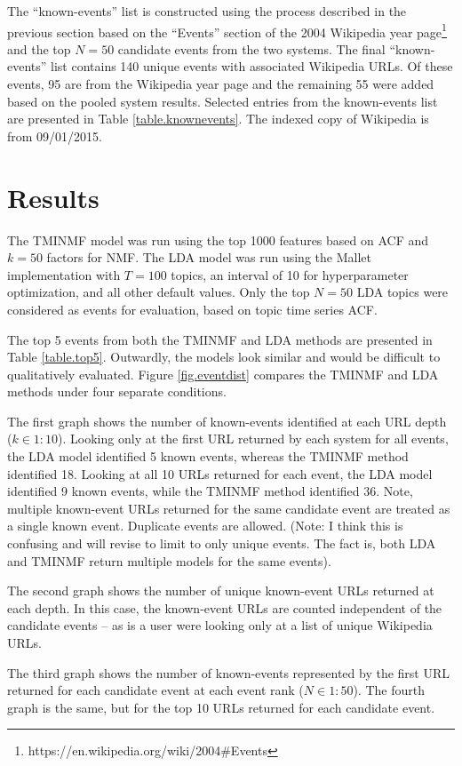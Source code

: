 \documentclass{sig-alternate}
\begin{document}
The ``known-events'' list is constructed using the process described in the previous section based on the ``Events'' section of the 2004 Wikipedia year page\footnote{https://en.wikipedia.org/wiki/2004\#Events} and the top $N=50$ candidate events from the two systems.  The final ``known-events'' list contains 140 unique events with associated Wikipedia URLs. Of these events, 95 are from the Wikipedia year page and the remaining 55 were added based on the pooled system results.  Selected entries from the known-events list are presented in Table \ref{table.knownevents}.  The indexed copy of Wikipedia is from 09/01/2015.

\section{Results}
The TMINMF model was run using the top 1000 features based on ACF and $k=50$ factors for NMF. The LDA model was run using the Mallet implementation with $T=100$ topics, an interval of 10 for hyperparameter optimization, and all other default values. Only the top $N=50$ LDA topics were considered as events for evaluation, based on topic time series ACF.

The top 5 events from both the TMINMF and LDA methods are presented in Table \ref{table.top5}. Outwardly, the models look similar and would be difficult to qualitatively evaluated.  Figure \ref{fig.eventdist} compares the TMINMF and LDA methods under four separate conditions.  

The first graph shows the number of known-events identified at each URL depth ($k \in 1:10$). Looking only at the first URL returned by each system for all events, the LDA model identified 5 known events, whereas the TMINMF method identified 18. Looking at all 10 URLs returned for each event, the LDA model identified 9 known events, while the TMINMF method identified 36. Note, multiple known-event URLs returned for the same candidate event are treated as a single known event. Duplicate events are allowed. (Note: I think this is confusing and will revise to limit to only unique events. The fact is, both LDA and TMINMF return multiple models for the same events).

The second graph shows the number of unique known-event URLs returned at each depth. In this case, the known-event URLs are counted independent of the candidate events -- as is a user were looking only at a list of unique Wikipedia URLs.

The third graph shows the number of known-events represented by the first URL returned for each candidate event at each event rank ($N \in 1:50$). The fourth graph is the same, but for the top 10 URLs returned for each candidate event.
\end{document}
